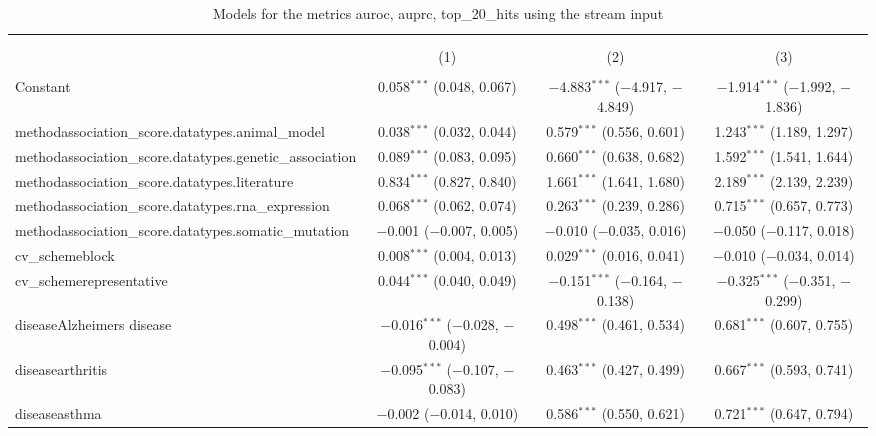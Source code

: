
\begin{table}[!htbp] \centering 
  \caption{Models for the metrics auroc, auprc, top_20_hits using the stream input} 
  \label{} 
\begin{tabular}{@{\extracolsep{5pt}}lccc} 
\\[-1.8ex]\hline 
\hline \\[-1.8ex] 
\\[-1.8ex] & (1) & (2) & (3)\\ 
\hline \\[-1.8ex] 
 Constant & 0.058$^{***}$ (0.048, 0.067) & $-$4.883$^{***}$ ($-$4.917, $-$4.849) & $-$1.914$^{***}$ ($-$1.992, $-$1.836) \\ 
  methodassociation\_score.datatypes.animal\_model & 0.038$^{***}$ (0.032, 0.044) & 0.579$^{***}$ (0.556, 0.601) & 1.243$^{***}$ (1.189, 1.297) \\ 
  methodassociation\_score.datatypes.genetic\_association & 0.089$^{***}$ (0.083, 0.095) & 0.660$^{***}$ (0.638, 0.682) & 1.592$^{***}$ (1.541, 1.644) \\ 
  methodassociation\_score.datatypes.literature & 0.834$^{***}$ (0.827, 0.840) & 1.661$^{***}$ (1.641, 1.680) & 2.189$^{***}$ (2.139, 2.239) \\ 
  methodassociation\_score.datatypes.rna\_expression & 0.068$^{***}$ (0.062, 0.074) & 0.263$^{***}$ (0.239, 0.286) & 0.715$^{***}$ (0.657, 0.773) \\ 
  methodassociation\_score.datatypes.somatic\_mutation & $-$0.001 ($-$0.007, 0.005) & $-$0.010 ($-$0.035, 0.016) & $-$0.050 ($-$0.117, 0.018) \\ 
  cv\_schemeblock & 0.008$^{***}$ (0.004, 0.013) & 0.029$^{***}$ (0.016, 0.041) & $-$0.010 ($-$0.034, 0.014) \\ 
  cv\_schemerepresentative & 0.044$^{***}$ (0.040, 0.049) & $-$0.151$^{***}$ ($-$0.164, $-$0.138) & $-$0.325$^{***}$ ($-$0.351, $-$0.299) \\ 
  diseaseAlzheimers disease & $-$0.016$^{***}$ ($-$0.028, $-$0.004) & 0.498$^{***}$ (0.461, 0.534) & 0.681$^{***}$ (0.607, 0.755) \\ 
  diseasearthritis & $-$0.095$^{***}$ ($-$0.107, $-$0.083) & 0.463$^{***}$ (0.427, 0.499) & 0.667$^{***}$ (0.593, 0.741) \\ 
  diseaseasthma & $-$0.002 ($-$0.014, 0.010) & 0.586$^{***}$ (0.550, 0.621) & 0.721$^{***}$ (0.647, 0.794) \\ 

\end{tabular}
\end{table}
